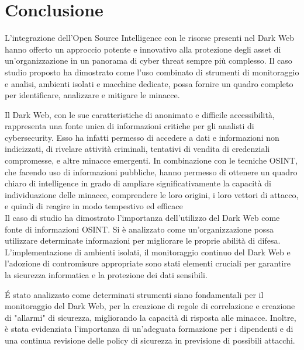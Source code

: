 \chapter*{Conclusione} %

L'integrazione dell'Open Source Intelligence con le risorse presenti nel Dark Web hanno offerto un approccio potente e innovativo alla protezione degli asset di un'organizzazione in un panorama di cyber threat sempre più complesso. Il caso studio proposto ha dimostrato come l'uso combinato di strumenti di monitoraggio e analisi, ambienti isolati e macchine dedicate, possa fornire un quadro completo per identificare, analizzare e mitigare le minacce.

Il Dark Web, con le sue caratteristiche di anonimato e difficile accessibilità, rappresenta una fonte unica di informazioni critiche per gli analisti di cybersecurity. Esso ha infatti permesso di accedere a dati e informazioni non indicizzati, di rivelare attività criminali, tentativi di vendita di credenziali compromesse, e altre minacce emergenti. In combinazione con le tecniche OSINT, che facendo uso di informazioni pubbliche, hanno permesso di ottenere un quadro chiaro di intelligence in grado di ampliare significativamente la capacità di individuazione delle minacce, comprendere le loro origini, i loro vettori di attacco, e quindi di reagire in modo tempestivo ed efficace\\

Il caso di studio ha dimostrato l'importanza dell'utilizzo del Dark Web come fonte di informazioni OSINT. Si è analizzato come un'organizzazione possa utilizzare determinate informazioni per migliorare le proprie abilità di difesa. L'implementazione di ambienti isolati, il monitoraggio continuo del Dark Web e l'adozione di contromisure appropriate sono stati elementi cruciali per garantire la sicurezza informatica e la protezione dei dati sensibili.

\'E stato analizzato come determinati strumenti siano fondamentali per il monitoraggio del Dark Web, per la creazione di regole di correlazione e creazione di "allarmi" di sicurezza, migliorando la capacità di risposta alle minacce. Inoltre, è stata evidenziata l'importanza di un'adeguata formazione per i dipendenti e di una continua revisione delle policy di sicurezza in previsione di possibili attacchi.

